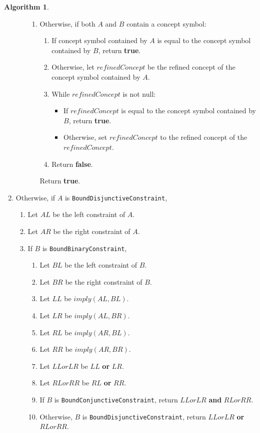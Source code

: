 \documentclass[a4paper,oneside,11pt]{book}
\theoremstyle{definition}
\newtheorem{algo}{Algorithm}[section]
\begin{document}
\begin{algo}
\begin{enumerate}
\begin{enumerate}
\begin{enumerate}
\item
Otherwise, if both $A$ and $B$ contain a concept symbol:
\begin{enumerate}
\item
If concept symbol contained by $A$ is equal to the concept symbol contained by $B$, return \textbf{true}.
\item
Otherwise, let $refinedConcept$ be the refined concept of the concept symbol contained by $A$.
\item
While $refinedConcept$ is not null:
\begin{itemize}
\item
If $refinedConcept$ is equal to the concept symbol contained by $B$, return \textbf{true}.
\item
Otherwise, set $refinedConcept$ to the refined concept of the $refinedConcept$.
\end{itemize}
\item
Return \textbf{false}.
\end{enumerate}
Return \textbf{true}.
\end{enumerate}
\end{enumerate}
\item
Otherwise, if $A$ is \verb|BoundDisjunctiveConstraint|,
\begin{enumerate}
\item
Let $AL$ be the left constraint of $A$.
\item
Let $AR$ be the right constraint of $A$.
\item
If $B$ is \verb|BoundBinaryConstraint|,
\begin{enumerate}
\item
Let $BL$ be the left constraint of $B$.
\item
Let $BR$ be the right constraint of $B$.
\item
Let $LL$ be $imply(AL, BL)$.
\item
Let $LR$ be $imply(AL, BR)$.
\item
Let $RL$ be $imply(AR, BL)$.
\item
Let $RR$ be $imply(AR, BR)$.
\item
Let $LLorLR$ be $LL$ \textbf{or} $LR$.
\item
Let $RLorRR$ be $RL$ \textbf{or} $RR$.
\item
If $B$ is \verb|BoundConjunctiveConstraint|, return $LLorLR$ \textbf{and} $RLorRR$.
\item
Otherwise, $B$ is \verb|BoundDisjunctiveConstraint|, return $LLorLR$ \textbf{or} $RLorRR$.
\end{enumerate}

\end{enumerate}
\end{enumerate}
\end{algo}
\end{document}
